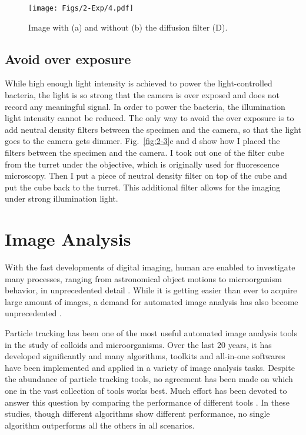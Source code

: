 \begin{figure}[!]
	\begin{center}
	\texttt{[image: Figs/2-Exp/4.pdf]}
	\end{center}
	\caption[Figure 2.4:]
	{
	Image with (a) and without (b) the diffusion filter (D).
	}
	\label{fig:2-4}
\end{figure}

\subsection{Avoid over exposure}

While high enough light intensity is achieved to power the light-controlled bacteria, the light is so strong that the camera is over exposed and does not record any meaningful signal. In order to power the bacteria, the illumination light intensity cannot be reduced. The only way to avoid the over exposure is to add neutral density filters between the specimen and the camera, so that the light goes to the camera gets dimmer. Fig.~\ref{fig:2-3}c and d show how I placed the filters between the specimen and the camera. I took out one of the filter cube from the turret under the objective, which is originally used for fluorescence microscopy. Then I put a piece of neutral density filter on top of the cube and put the cube back to the turret. This additional filter allows for the imaging under strong illumination light.

\section{Image Analysis}
\label{sec:image-analysis}
With the fast developments of digital imaging, human are enabled to investigate many processes, ranging from astronomical object motions to microorganism behavior, in unprecedented detail \cite{Kalaidzidis2007}. While it is getting easier than ever to acquire large amount of images, a demand for automated image analysis has also become unprecedented \cite{Meijering2006, Jaqaman2008, Rohr2010}.

Particle tracking has been one of the most useful automated image analysis tools in the study of colloids and microorganisms. Over the last 20 years, it has developed significantly and many algorithms, toolkits and all-in-one softwares have been implemented and applied in a variety of image analysis tasks. Despite the abundance of particle tracking tools, no agreement has been made on which one in the vast collection of tools works best. Much effort has been devoted to answer this question by comparing the performance of different tools \cite{Kalaidzidis2007, Dorn2008, Meijering2009, Smal2010, Meijering2012,
Chenouard2014, Maska2014, Hilsenbeck2016}. In these studies, though different algorithms show different performance, no single algorithm outperforms all the others in all scenarios.

